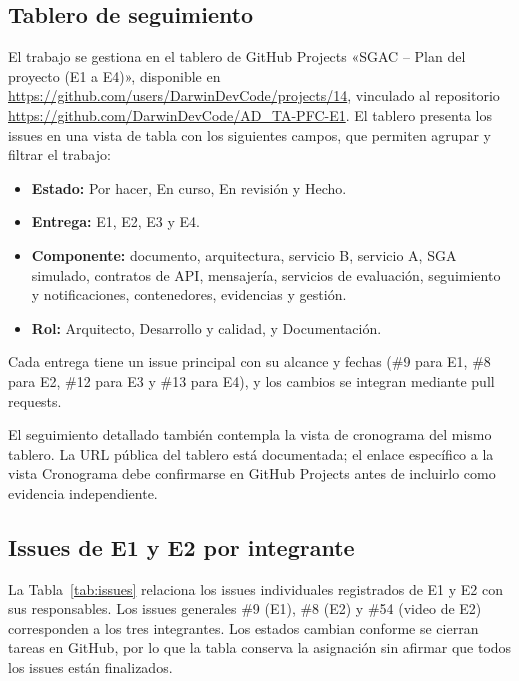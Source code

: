 \subsection{Tablero de seguimiento}
El trabajo se gestiona en el tablero de GitHub Projects «SGAC -- Plan del proyecto (E1 a E4)», disponible en \url{https://github.com/users/DarwinDevCode/projects/14}, vinculado al repositorio \url{https://github.com/DarwinDevCode/AD_TA-PFC-E1}. El tablero presenta los issues en una vista de tabla con los siguientes campos, que permiten agrupar y filtrar el trabajo:
\begin{itemize}
  \item \textbf{Estado:} Por hacer, En curso, En revisión y Hecho.
  \item \textbf{Entrega:} E1, E2, E3 y E4.
  \item \textbf{Componente:} documento, arquitectura, servicio B, servicio A, SGA simulado, contratos de API, mensajería, servicios de evaluación, seguimiento y notificaciones, contenedores, evidencias y gestión.
  \item \textbf{Rol:} Arquitecto, Desarrollo y calidad, y Documentación.
\end{itemize}
Cada entrega tiene un issue principal con su alcance y fechas (\#9 para E1, \#8 para E2, \#12 para E3 y \#13 para E4), y los cambios se integran mediante pull requests.

El seguimiento detallado también contempla la vista de cronograma del mismo tablero. La URL pública del tablero está documentada; el enlace específico a la vista Cronograma debe confirmarse en GitHub Projects antes de incluirlo como evidencia independiente.

\subsection{Issues de E1 y E2 por integrante}
La Tabla~\ref{tab:issues} relaciona los issues individuales registrados de E1 y E2 con sus responsables. Los issues generales \#9 (E1), \#8 (E2) y \#54 (video de E2) corresponden a los tres integrantes. Los estados cambian conforme se cierran tareas en GitHub, por lo que la tabla conserva la asignación sin afirmar que todos los issues están finalizados.

